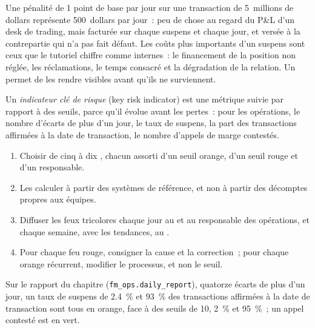 Une pénalité de 1 point de base par jour sur une transaction de 5~millions de dollars représente 500~dollars par jour~: peu de chose au regard du P\&L d'un desk de trading, mais facturée sur chaque suspens et chaque jour,
et versée à la contrepartie qui n'a pas fait défaut. Les coûts plus importants d'un suspens sont ceux que le tutoriel chiffre comme internes~: le financement de la position non réglée,
les réclamations, le temps consacré et la dégradation de la relation. Un  permet de les rendre visibles avant qu'ils ne surviennent.

\begin{definition}\label{def:fm:operations:kri}
Un \emph{indicateur clé de risque} (key risk indicator) est une métrique suivie par rapport à des seuils, parce qu'il évolue avant les pertes~: pour
les opérations, le nombre d'écarts de plus d'un jour, le taux de suspens, la part des transactions affirmées à la date de transaction, le nombre d'appels de marge contestés.
\end{definition}

\begin{method}\label{met:fm:operations:report}
\begin{enumerate}
\item Choisir de cinq à dix , chacun assorti d'un seuil orange, d'un seuil rouge et d'un responsable.
\item Les calculer à partir des systèmes de référence, et non à partir des décomptes propres aux équipes.
\item Diffuser les feux tricolores chaque jour au  et au responsable des opérations, et chaque semaine, avec les tendances, au .
\item Pour chaque feu rouge, consigner la cause et la correction~; pour chaque orange récurrent, modifier le processus, et non le seuil.
\end{enumerate}
\end{method}

Sur le rapport du chapitre (\texttt{fm\_ops.daily\_report}), quatorze écarts de plus d'un jour, un taux de suspens de 2.4~\% et 93~\% des transactions affirmées à la
date de transaction sont tous en orange, face à des seuils de 10, 2~\% et 95~\%~; un appel contesté est en vert.

